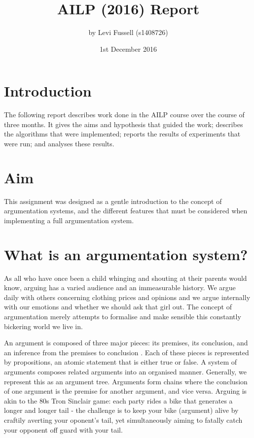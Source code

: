 \documentclass[10pt,a4paper,twocolumn]{article}
\title{AILP (2016) Report}               %
\author{by Levi Fussell (s1408726)}
\date{1st December 2016}                 %
\begin{document}
\maketitle  %
%
\section{Introduction}

The following report describes work done in the AILP
course over the course of three months. It gives the aims and hypothesis that guided the work;
describes the algorithms that were implemented; reports the results
of experiments that were run; and analyses these results.

\section{Aim}

This assignment was designed as a gentle introduction to the concept of argumentation systems,
and the different features that must be considered when implementing a full
argumentation system.

\section{What is an argumentation system?}

As all who have
once been a child whinging and shouting at their parents would know, arguing has
a varied audience and an immeasurable history. We argue daily
with others concerning clothing prices and opinions and we argue internally with our
emotions and whether we should ask that girl out. The concept of argumentation merely attempts to
formalise and make sensible this constantly bickering world we live in.

An argument is composed of three major pieces: its premises, its conclusion,
and an inference from the premises to conclusion \cite{ES2}. Each of
these pieces is represented by propositions, an atomic statement that is either
true or false. A system of arguments composes related arguments into an
organised manner. Generally, we represent this as an argument tree.
Arguments form chains where the conclusion of one argument is the premise for
another argument, and vice versa. Arguing is akin to the 80s Tron Sinclair game:
each party rides a bike that generates a longer and longer tail - the
challenge is to keep your bike (argument) alive by craftily averting your
oponent's tail, yet
simultaneously aiming to fatally catch your opponent off guard with your tail.
\end{document}
